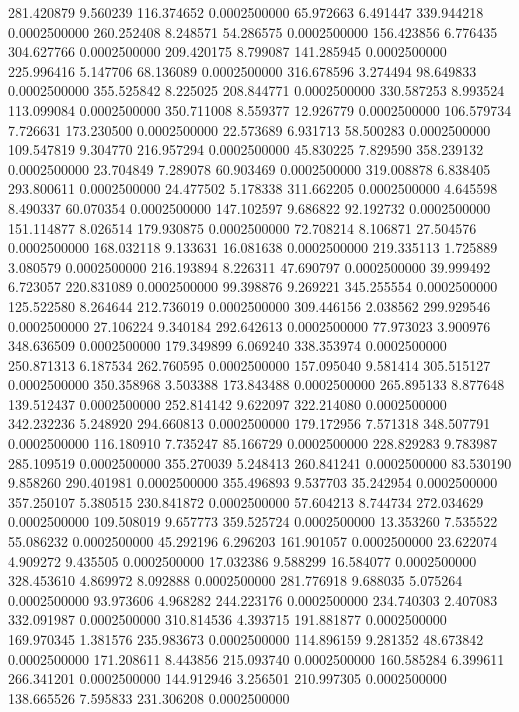 281.420879 9.560239 116.374652 0.0002500000
65.972663 6.491447 339.944218 0.0002500000
260.252408 8.248571 54.286575 0.0002500000
156.423856 6.776435 304.627766 0.0002500000
209.420175 8.799087 141.285945 0.0002500000
225.996416 5.147706 68.136089 0.0002500000
316.678596 3.274494 98.649833 0.0002500000
355.525842 8.225025 208.844771 0.0002500000
330.587253 8.993524 113.099084 0.0002500000
350.711008 8.559377 12.926779 0.0002500000
106.579734 7.726631 173.230500 0.0002500000
22.573689 6.931713 58.500283 0.0002500000
109.547819 9.304770 216.957294 0.0002500000
45.830225 7.829590 358.239132 0.0002500000
23.704849 7.289078 60.903469 0.0002500000
319.008878 6.838405 293.800611 0.0002500000
24.477502 5.178338 311.662205 0.0002500000
4.645598 8.490337 60.070354 0.0002500000
147.102597 9.686822 92.192732 0.0002500000
151.114877 8.026514 179.930875 0.0002500000
72.708214 8.106871 27.504576 0.0002500000
168.032118 9.133631 16.081638 0.0002500000
219.335113 1.725889 3.080579 0.0002500000
216.193894 8.226311 47.690797 0.0002500000
39.999492 6.723057 220.831089 0.0002500000
99.398876 9.269221 345.255554 0.0002500000
125.522580 8.264644 212.736019 0.0002500000
309.446156 2.038562 299.929546 0.0002500000
27.106224 9.340184 292.642613 0.0002500000
77.973023 3.900976 348.636509 0.0002500000
179.349899 6.069240 338.353974 0.0002500000
250.871313 6.187534 262.760595 0.0002500000
157.095040 9.581414 305.515127 0.0002500000
350.358968 3.503388 173.843488 0.0002500000
265.895133 8.877648 139.512437 0.0002500000
252.814142 9.622097 322.214080 0.0002500000
342.232236 5.248920 294.660813 0.0002500000
179.172956 7.571318 348.507791 0.0002500000
116.180910 7.735247 85.166729 0.0002500000
228.829283 9.783987 285.109519 0.0002500000
355.270039 5.248413 260.841241 0.0002500000
83.530190 9.858260 290.401981 0.0002500000
355.496893 9.537703 35.242954 0.0002500000
357.250107 5.380515 230.841872 0.0002500000
57.604213 8.744734 272.034629 0.0002500000
109.508019 9.657773 359.525724 0.0002500000
13.353260 7.535522 55.086232 0.0002500000
45.292196 6.296203 161.901057 0.0002500000
23.622074 4.909272 9.435505 0.0002500000
17.032386 9.588299 16.584077 0.0002500000
328.453610 4.869972 8.092888 0.0002500000
281.776918 9.688035 5.075264 0.0002500000
93.973606 4.968282 244.223176 0.0002500000
234.740303 2.407083 332.091987 0.0002500000
310.814536 4.393715 191.881877 0.0002500000
169.970345 1.381576 235.983673 0.0002500000
114.896159 9.281352 48.673842 0.0002500000
171.208611 8.443856 215.093740 0.0002500000
160.585284 6.399611 266.341201 0.0002500000
144.912946 3.256501 210.997305 0.0002500000
138.665526 7.595833 231.306208 0.0002500000
